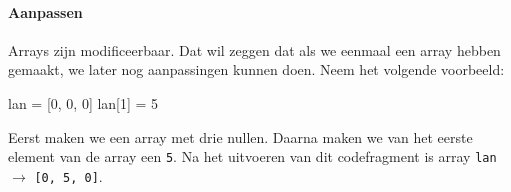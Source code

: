 \paragraph{Aanpassen}
Arrays zijn modificeerbaar. Dat wil zeggen dat als we eenmaal een array hebben gemaakt, we later nog aanpassingen kunnen doen. Neem het volgende voorbeeld:

\begin{nnflisting}
lan = [0, 0, 0]
lan[1] = 5
\end{nnflisting}

Eerst maken we een array met drie nullen. Daarna maken we van het eerste element van de array een \texttt{5}. Na het uitvoeren van dit codefragment is array \texttt{lan} $\rightarrow$ \texttt{[0, 5, 0]}.
